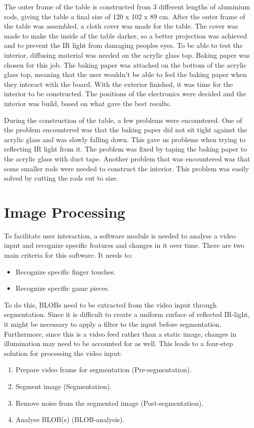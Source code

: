 The outer frame of the table is constructed from 3 different lengths of aluminium rods, giving the table a final size of 120 x 102 x 89 cm.
After the outer frame of the table was assembled, a cloth cover was made for the table. The cover was made to make the inside af the table darker, so a better projection was achieved and to prevent the IR light from damaging peoples eyes. To be able to test the interior, diffusing material was needed on the acrylic glass top. Baking paper was chosen for this job. The baking paper was attached on the bottom of the acrylic glass top, meaning that the user wouldn't be able to feel the baking paper when they interact with the board. 
With the exterior finished, it was time for the interior to be constructed. The positions of the electronics were decided and the interior was build, based on what gave the best results. 

During the construction of the table, a few problems were encountered. One of the problem encountered was that the baking paper did not sit tight against the acrylic glass and was slowly falling down. This gave us problems when trying to reflecting IR light from it. The problem was fixed by taping the baking paper to the acrylic glass with duct tape. 
Another problem that was encountered was that some smaller rods were needed to construct the interior. This problem was easily solved by cutting the rods cut to size. 

\section{Image Processing}
To facilitate user interaction, a software module is needed to analyse a video input and recognize specific features and changes in it over time. There are two main criteria for this software. It needs to:
\begin{itemize}
\item Recognize specific finger touches.
\item Recognize specific game pieces.
\end{itemize}

To do this, BLOBs need to be extracted from the video input through segmentation. Since it is difficult to create a uniform surface of reflected IR-light, it might be necessary to apply a filter to the input before segmentation. Furthermore, since this is a video feed rather than a static image, changes in illumination may need to be accounted for as well. This leads to a four-step solution for processing the video input:
\begin{enumerate}
\item Prepare video frame for segmentation (Pre-segmentation).
\item Segment image (Segmentation).
\item Remove noise from the segmented image (Post-segmentation).
\item Analyse BLOB(s) (BLOB-analysis).
\end{enumerate}

